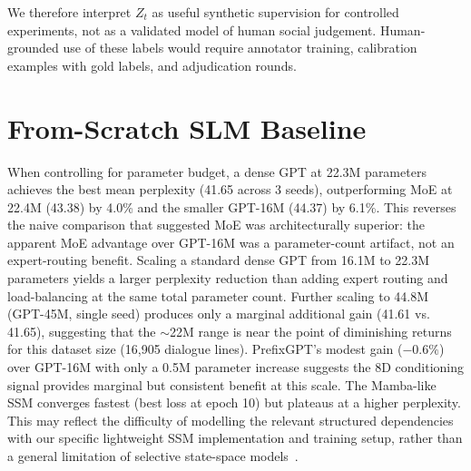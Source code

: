 \documentclass[11pt]{article}
\begin{document}
We therefore interpret $Z_t$ as useful synthetic supervision for controlled experiments, not as a validated model of human social judgement.
Human-grounded use of these labels would require annotator training, calibration examples with gold labels, and adjudication rounds.

\section{From-Scratch SLM Baseline}
\label{app:slm_baseline}

\begin{table}[t]
\centering
\caption{From-scratch SLM validation perplexity (20 epochs, 3 seeds). \textbf{Bold}: best mean. GPT-22M is param-matched to MoE at $\sim$22M.}
\label{tab:slm}
\small
{}
\end{table}

When controlling for parameter budget, a dense GPT at 22.3M parameters achieves the best mean perplexity (41.65 across 3 seeds), outperforming MoE at 22.4M (43.38) by 4.0\% and the smaller GPT-16M (44.37) by 6.1\%.
This reverses the naive comparison that suggested MoE was architecturally superior: the apparent MoE advantage over GPT-16M was a parameter-count artifact, not an expert-routing benefit.
Scaling a standard dense GPT from 16.1M to 22.3M parameters yields a larger perplexity reduction than adding expert routing and load-balancing at the same total parameter count.
Further scaling to 44.8M (GPT-45M, single seed) produces only a marginal additional gain (41.61 vs. 41.65), suggesting that the $\sim$22M range is near the point of diminishing returns for this dataset size (16,905 dialogue lines).
PrefixGPT's modest gain ($-0.6\%$) over GPT-16M with only a 0.5M parameter increase suggests the 8D conditioning signal provides marginal but consistent benefit at this scale.
The Mamba-like SSM converges fastest (best loss at epoch 10) but plateaus at a higher perplexity.
This may reflect the difficulty of modelling the relevant structured dependencies with our specific lightweight SSM implementation and training setup, rather than a general limitation of selective state-space models~\cite{gu2023mamba}.
\end{document}
